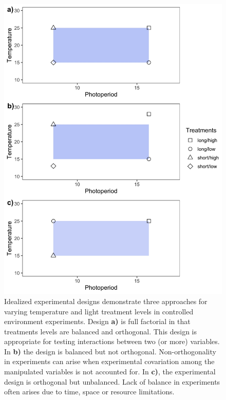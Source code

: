 \documentclass[11pt]{article}
\begin{document}
\begin{figure}[h!]
    \centering
 \includegraphics[width=.8\textwidth]{..//Plots/periodicity_figures/factorial.jpeg}
    \caption{Idealized experimental designs demonstrate three approaches for varying temperature and light treatment levels in controlled environment experiments. Design \textbf{a)} is full factorial in that treatments levels are balanced and orthogonal. This design is appropriate for testing interactions between two (or more) variables. In \textbf{b)} the design is balanced but not orthogonal. Non-orthogonality in experiments can arise when experimental covariation among the manipulated variables is not accounted for. In \textbf{c)}, the experimental design is orthogonal but unbalanced. Lack of balance in experiments often arises due to time, space or resource limitations. }
    \label{fig:examp}
\end{figure}
\end{document}

